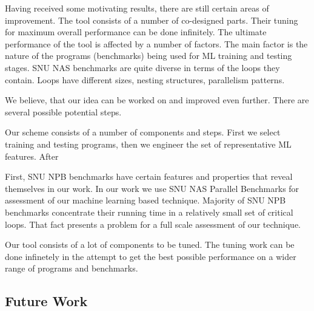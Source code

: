 \documentclass[sigconf,10pt,review,anonymous]{acmart}
\begin{document}
Having received some motivating results, there are still certain areas of improvement. The tool consists of a number of co-designed parts. Their tuning for maximum overall performance can be done infinitely. The ultimate performance of the tool is affected by a number of factors. The main factor is the nature of the programs (benchmarks) being used for ML training and testing stages. SNU NAS benchmarks are quite diverse in terms of the loops they contain. Loops have different sizes, nesting structures, parallelism patterns.

\quad We believe, that our idea can be worked on and improved even further. There are several possible potential steps.

\quad Our scheme consists of a number of components and steps. First we select training and testing programs, then we engineer the set of representative ML features. After 

\quad First, SNU NPB benchmarks have certain features and properties that reveal themselves in our work. 
\quad In our work we use SNU NAS Parallel Benchmarks for assessment of our machine learning based technique. Majority of SNU NPB benchmarks concentrate their running time in a relatively small set of critical loops. That fact presents a problem for a full scale assessment of our technique.      



Our tool consists of a lot of components to be tuned. The tuning work can be done infinetely in the attempt to get the best possible performance on a wider range of programs and benchmarks.    

\subsection{Future Work}







\end{document}
